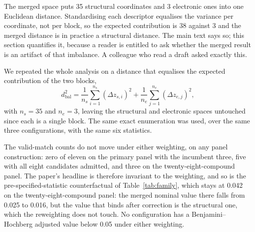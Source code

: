 \documentclass[journal=jacsat,manuscript=suppinfo,margin=1in]{achemso}
\begin{document}
The merged space puts 35 structural coordinates and 3 electronic ones into one
Euclidean distance. Standardising each descriptor equalises the variance per
coordinate, not per block, so the expected contribution is 38 against 3 and the
merged distance is in practice a structural distance. The main text says so; this
section quantifies it, because a reader is entitled to ask whether the merged
result is an artifact of that imbalance. A colleague who read a draft asked
exactly this.

We repeated the whole analysis on a distance that equalises the expected
contribution of the two blocks,
\begin{equation}
d_{\mathrm{bal}}^{2}=\frac{1}{n_{s}}\sum_{i=1}^{n_{s}}(\Delta z_{s,i})^{2}
 +\frac{1}{n_{e}}\sum_{j=1}^{n_{e}}(\Delta z_{e,j})^{2},
\end{equation}
with $n_{s}=35$ and $n_{e}=3$, leaving the structural and electronic spaces
untouched since each is a single block. The same exact enumeration was used, over
the same three configurations, with the same six statistics.

\begin{table}[!htb]
\centering
\caption{Equal weight per descriptor against equal weight per block, in the
merged space. Valid-match counts are identical under the two weightings on
every panel construction. The smallest $p$ is taken over the eighteen-test
family of three spaces by six statistics, and $q$ is the
Benjamini--Hochberg adjusted value of that family.}
\label{tab:blockbalance}
\small

\end{table}

The valid-match counts do not move under either weighting, on any panel
construction: zero of eleven on the primary panel with the incumbent three,
five with all eight candidates admitted, and three on the
twenty-eight-compound panel. The paper's headline is therefore invariant to
the weighting, and
so is the pre-specified-statistic counterfactual of Table~\ref{tab:family},
which stays at 0.042 on the twenty-eight-compound panel: the merged nominal value
there falls from 0.025 to 0.016, but the value that binds after correction is the
structural one, which the reweighting does not touch. No configuration has a
Benjamini--Hochberg adjusted value below 0.05 under either weighting.
\end{document}
